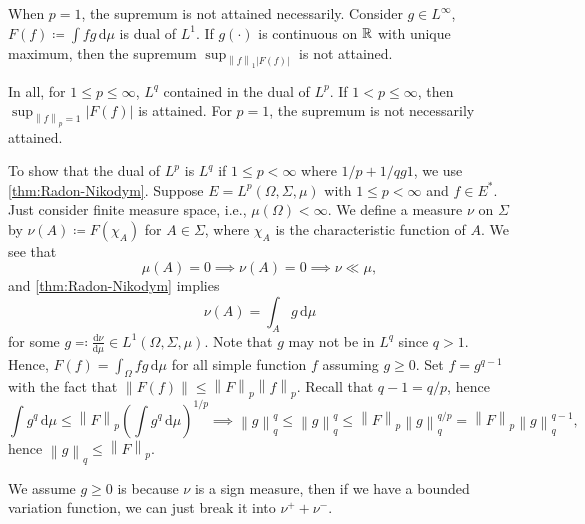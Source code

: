 \begin{remark}
	When \(p = 1\), the supremum is not attained necessarily. Consider \(g\in L^{\infty} \), \(F(f) \coloneqq \int fg\,\mathrm{d} \mu \) is dual of \(L^1\). If \(g(\cdot)\) is continuous on \(\mathbb{\MakeUppercase{r}} \) with unique maximum, then the supremum \(\sup _{\left\lVert f\right\rVert _1 \left\vert F(f) \right\vert }\) is not attained.
\end{remark}

\begin{note}
	In all, for \(1 \leq p\leq \infty \), \(L^q\) contained in the dual of \(L^p\). If \(1 < p \leq \infty \), then \(\sup _{\left\lVert f\right\rVert _p = 1} \left\vert F(f) \right\vert \) is attained. For \(p = 1\), the supremum is not necessarily attained.
\end{note}

To show that the dual of \(L^p\) is \(L^q\) if \(1 \leq p < \infty \) where \(1 / p + 1 / q g 1\), we use \autoref{thm:Radon-Nikodym}. Suppose \(E = L^p(\Omega , \Sigma , \mu )\) with \(1 \leq p < \infty \) and \(f\in E^{\ast} \). Just consider finite measure space, i.e., \(\mu (\Omega ) < \infty \). We define a measure \(\nu \) on \(\Sigma \) by \(\nu (A) \coloneqq F(\chi _A)\) for \(A\in \Sigma \), where \(\chi _A\) is the characteristic function of \(A\). We see that
\[
	\mu (A) = 0 \implies \nu (A) = 0 \implies \nu \ll \mu,
\]
and \autoref{thm:Radon-Nikodym} implies
\[
	\nu (A) = \int _A g\,\mathrm{d} \mu
\]
for some \(g \eqqcolon \frac{\mathrm{d}\nu }{\mathrm{d}\mu } \in L^1(\Omega , \Sigma , \mu )\). Note that \(g\) may not be in \(L^q\) since \(q > 1\). Hence, \(F(f)= \int _\Omega fg \,\mathrm{d} \mu \) for all simple function \(f\) assuming \(g \geq 0\). Set \(f = g^{q - 1}\) with the fact that \(\left\lVert F(f)\right\rVert \leq \left\lVert F\right\rVert _p \left\lVert f\right\rVert _p\). Recall that \(q - 1 = q / p\), hence
\[
	\int g^q\,\mathrm{d} \mu \leq \left\lVert F\right\rVert _p \left( \int g^q \,\mathrm{d} \mu  \right) ^{1 / p} \implies \left\lVert g\right\rVert _q ^q \leq \left\lVert g\right\rVert _q^q \leq \left\lVert F\right\rVert _p \left\lVert g\right\rVert _q ^{q / p} = \left\lVert F\right\rVert _p \left\lVert g\right\rVert _q ^{q - 1},
\]
hence \(\left\lVert g\right\rVert _q \leq \left\lVert F\right\rVert _p\).

\begin{note}
	We assume \(g \geq 0\) is because \(\nu \) is a sign measure, then if we have a bounded variation function, we can just break it into \(\nu ^+ + \nu ^-\).
\end{note}

